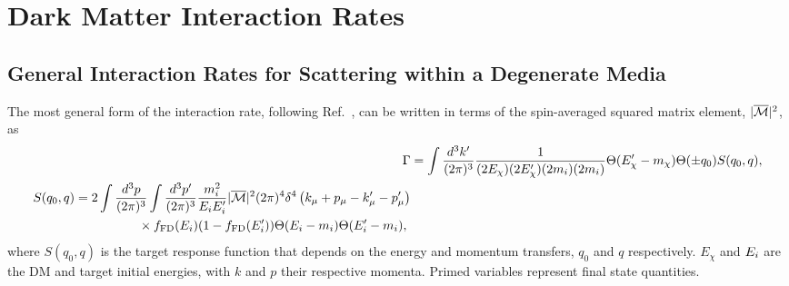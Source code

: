 \chapter{Dark Matter Interaction Rates}
\label{appendix:interaction_rates}

\section{General Interaction Rates for Scattering within a Degenerate Media}
\label{app:sec:genral_int_rate}

The most general form of the interaction rate, following Ref.~\cite{Bertoni:2013bsa_dec_DarkMatterThermalization}, can be written in terms of the spin-averaged squared matrix element, $|\overline{\mathcal M}|^2$, as
\begin{align}
    \Gamma &= \int\frac{d^3 k'}{(2\pi)^3}\frac{1}{(2E_\chi)(2E_\chi')(2m_i)(2m_i)}\Theta(E_\chi' - m_\chi)\Theta(\pm q_0)S(q_0, q),\\
    \begin{split}
        S(q_0, q) & = 2\int\frac{d^3 p}{(2\pi)^3}\int\frac{d^3 p'}{(2\pi)^3}\frac{m_i^2}{E_i E_i'}|\overline{\mathcal M}|^2(2\pi)^4\delta^4\left( k_\mu + p_\mu - k_\mu' - p_\mu'\right)\\
        &\hspace{5em}\times f_{\rm FD}(E_i)(1 - f_{\rm FD}(E_i'))\Theta(E_i - m_i)\Theta(E_i' - m_i),\label{app:eq:full_response_S}
    \end{split}
\end{align}
where $S(q_0, q)$ is the target response function that depends on the energy and momentum transfers, $q_0$ and $q$ respectively.  $E_\chi$ and $E_i$ are the DM and target initial energies, with $k$ and $p$ their respective momenta. Primed variables represent final state quantities.  

